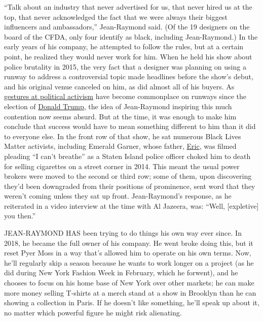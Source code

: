 ``Talk about an industry that never advertised for us, that never hired
us at the top, that never acknowledged the fact that we were always
their biggest influencers and ambassadors,'' Jean-Raymond said. (Of the
19 designers on the board of the CFDA, only four identify as black,
including Jean-Raymond.) In the early years of his company, he attempted
to follow the rules, but at a certain point, he realized they would
never work for him. When he held his show about police brutality in
2015, the very fact that a designer was planning on using a runway to
address a controversial topic made headlines before the show's debut,
and his original venue canceled on him, as did almost all of his buyers.
As
\href{https://www.nytimes3xbfgragh.onion/interactive/2019/03/21/t-magazine/fashion-future-history.html}{gestures
at political activism} have become commonplace on runways since the
election of
\href{https://www.nytimes3xbfgragh.onion/topic/person/donald-trump}{Donald
Trump}, the idea of Jean-Raymond inspiring this much contention now
seems absurd. But at the time, it was enough to make him conclude that
success would have to mean something different to him than it did to
everyone else. In the front row of that show, he sat numerous Black
Lives Matter activists, including Emerald Garner, whose father,
\href{https://www.nytimes3xbfgragh.onion/2019/07/16/nyregion/eric-garner-case-death-daniel-pantaleo.html}{Eric},
was filmed pleading ``I can't breathe'' as a Staten Island police
officer choked him to death for selling cigarettes on a street corner in
2014. This meant the usual power brokers were moved to the second or
third row; some of them, upon discovering they'd been downgraded from
their positions of prominence, sent word that they weren't coming unless
they sat up front. Jean-Raymond's response, as he reiterated in a video
interview at the time with Al Jazeera, was: ``Well, {[}expletive{]} you
then.''

JEAN-RAYMOND HAS been trying to do things his own way ever since. In
2018, he became the full owner of his company. He went broke doing this,
but it reset Pyer Moss in a way that's allowed him to operate on his own
terms. Now, he'll regularly skip a season because he wants to work
longer on a project (as he did during New York Fashion Week in February,
which he forwent), and he chooses to focus on his home base of New York
over other markets; he can make more money selling T-shirts at a merch
stand at a show in Brooklyn than he can showing a collection in Paris.
If he doesn't like something, he'll speak up about it, no matter which
powerful figure he might risk alienating.

